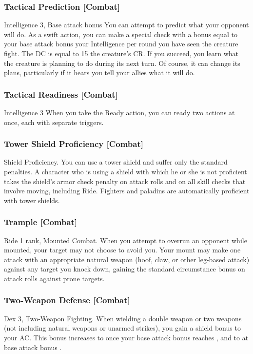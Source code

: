 \subsubsection{Tactical Prediction [Combat]}
 Intelligence 3, Base attack bonus 
 You can attempt to predict what your opponent will do. As a swift action, you can make a special check with a bonus equal to your base attack bonus \add your Intelligence  per round you have seen the creature fight. The DC is equal to 15 \add the creature's CR. If you succeed, you learn what the creature is planning to do during its next turn. Of course, it can change its plans, particularly if it hears you tell your allies what it will do.

\subsubsection{Tactical Readiness [Combat]}
 Intelligence 3
 When you take the Ready action, you can ready two actions at once, each with separate triggers.

\subsubsection{Tower Shield Proficiency [Combat]}
 Shield Proficiency.
 You can use a tower shield and suffer only the standard penalties.
 A character who is using a shield with which he or she is not proficient takes the shield's armor check penalty on attack rolls and on all skill checks that involve moving, including Ride.
 Fighters and paladins are automatically proficient with tower shields.

\subsubsection{Trample [Combat]}
 Ride 1 rank, Mounted Combat.
 When you attempt to overrun an opponent while mounted, your target may not choose to avoid you. Your mount may make one attack with an appropriate natural weapon (hoof, claw, or other leg-based attack) against any target you knock down, gaining the standard  circumstance bonus on attack rolls against prone targets.

\subsubsection{Two-Weapon Defense [Combat]}
 Dex 3, Two-Weapon Fighting.
 When wielding a double weapon or two weapons (not including natural weapons or unarmed strikes), you gain a  shield bonus to your AC. This bonus increases to  once your base attack bonus reaches , and to  at base attack bonus .

